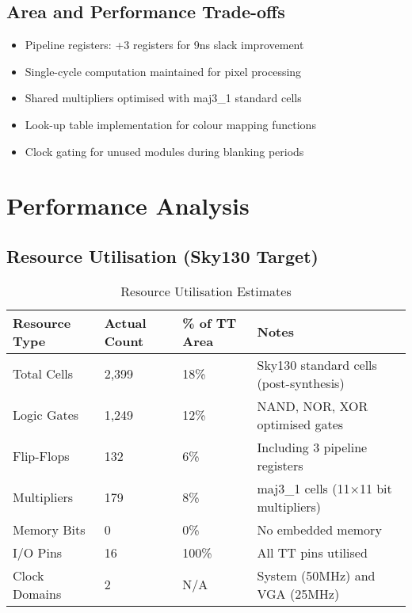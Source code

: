 \documentclass[11pt,a4paper]{article}
\begin{document}
\subsection{Area and Performance Trade-offs}
\begin{itemize}
\item Pipeline registers: +3 registers for 9ns slack improvement
\item Single-cycle computation maintained for pixel processing
\item Shared multipliers optimised with maj3\_1 standard cells  
\item Look-up table implementation for colour mapping functions
\item Clock gating for unused modules during blanking periods
\end{itemize}

\newpage
\section{Performance Analysis}

\subsection{Resource Utilisation (Sky130 Target)}
\begin{table}[h]
\centering
\begin{tabularx}{\textwidth}{|l|l|l|X|}
\hline
\rowcolor{darkblue!20}
\textbf{Resource Type} & \textbf{Actual Count} & \textbf{\% of TT Area} & \textbf{Notes} \\
\hline
Total Cells & 2,399 & 18\% & Sky130 standard cells (post-synthesis) \\
Logic Gates & 1,249 & 12\% & NAND, NOR, XOR optimised gates \\
Flip-Flops & 132 & 6\% & Including 3 pipeline registers \\
Multipliers & 179 & 8\% & maj3\_1 cells (11×11 bit multipliers) \\
Memory Bits & 0 & 0\% & No embedded memory \\
I/O Pins & 16 & 100\% & All TT pins utilised \\
Clock Domains & 2 & N/A & System (50MHz) and VGA (25MHz) \\
\hline
\end{tabularx}
\caption{Resource Utilisation Estimates}
\end{table}
\end{document}
